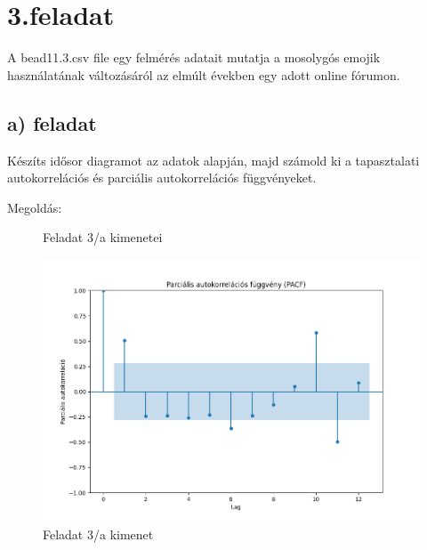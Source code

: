 \documentclass[11pt,a4paper,oneside]{report}
\begin{document}
\chapter{3.feladat}
A bead11.3.csv file egy felmérés adatait mutatja a mosolygós emojik használatának változásáról az elmúlt években egy adott online fórumon.

\section{a) feladat}
Készíts idősor diagramot az adatok alapján, majd számold ki a tapasztalati autokorrelációs és parciális autokorrelációs függvényeket.

Megoldás:

\begin{figure}%
  \centering
  \qquad
  \caption{Feladat 3/a kimenetei}%
  \label{fig:example}%
\end{figure}

\begin{figure}[!ht]
  \begin{center}
    \includegraphics[scale=0.4]{Figure_3.png}
    \caption{Feladat 3/a kimenet}
    \label{fig:TexnicCenter}
  \end{center}
\end{figure}
\end{document}
